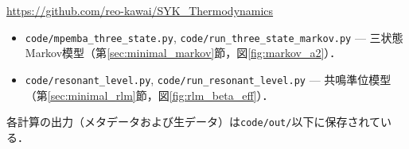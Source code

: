 \documentclass[a4paper,11pt,onecolumn,baselineskip=14.5pt]{jlreq}
\begin{document}
\begin{center}
  \url{https://github.com/reo-kawai/SYK_Thermodynamics}
\end{center}

\begin{itemize}
  \item \texttt{code/mpemba\_three\_state.py}, \texttt{code/run\_three\_state\_markov.py}
        --- 三状態Markov模型（第\ref{sec:minimal_markov}節，図\ref{fig:markov_a2}）．
  \item \texttt{code/resonant\_level.py}, \texttt{code/run\_resonant\_level.py}
        --- 共鳴準位模型（第\ref{sec:minimal_rlm}節，図\ref{fig:rlm_beta_eff}）．
\end{itemize}

各計算の出力（メタデータおよび生データ）は\texttt{code/out/}以下に保存されている．
\end{document}

